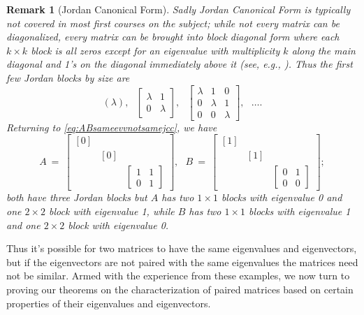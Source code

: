 \documentclass{article}
\newtheorem{rek}{Remark}
\newcommand{\mattwo}[4]
{\left[\begin{array}{cc}
                        #1  & #2   \\
                        #3 &  #4
                          \end{array}\right] }
\newcommand{\matthree}[9]
{\left[\begin{array}{ccc}
                        #1  & #2 & #3  \\
                        #4 &  #5 & #6 \\
                        #7 &  #8 & #9
                          \end{array}\right] }
\begin{document}
\begin{rek}[Jordan Canonical Form] Sadly Jordan Canonical Form is typically not covered in most first courses on the subject; while not every matrix can be diagonalized, every matrix can be brought into block diagonal form where each $k \times k$ block is all zeros except  for an eigenvalue with multiplicity $k$ along the main diagonal and 1's on the diagonal immediately above it (see, e.g., \cite[Section\,3.4]{Zh}).
 Thus the first few Jordan blocks by size are \begin{equation} (\lambda), \ \ \ \mattwo{\lambda}{1}{0}{\lambda}, \ \ \  \matthree{\lambda}{1}{0}{0}{\lambda}{1}{0}{0}{\lambda}, \ \ \  \dots. \end{equation} Returning to  \eqref{eq:ABsameevvnotsamejcc}, we have \begin{equation}
    A \ = \ \matthree{[0]}{}{}{}{[0]}{}{}{}{\mattwo{1}{1}{0}{1}}, \ \ \ B \ =\  \matthree{[1]}{}{}{}{[1]}{}{}{}{\mattwo{0}{1}{0}{0}};
\end{equation} both have three Jordan blocks but $A$ has two $1\times 1$ blocks with eigenvalue 0 and one $2\times 2$ block with eigenvalue 1, while   $B$ has
two $1\times 1$ blocks with eigenvalue 1 and one $2\times 2$ block with eigenvalue 0.
\end{rek}


Thus it's  possible for two matrices to have the same eigenvalues and eigenvectors, but if the eigenvectors are not paired with the same eigenvalues the matrices need not be similar. Armed with the experience from these examples, we now turn to proving our theorems on the characterization of paired matrices based on certain properties of their eigenvalues and eigenvectors.




\end{document}
